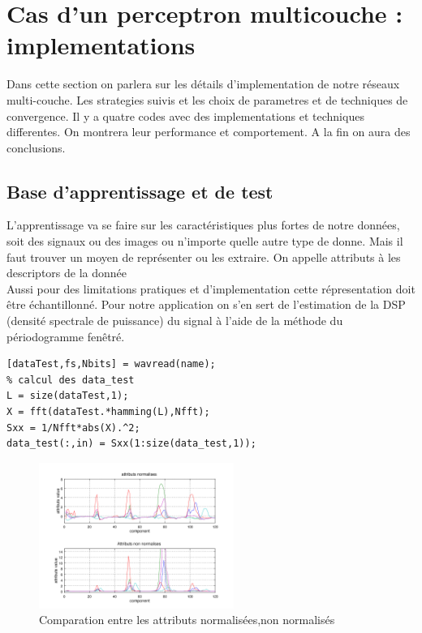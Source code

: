 \documentclass[journal]{IEEEtran}
\begin{document}
%
%
\section{Cas d’un perceptron multicouche : implementations}
Dans cette section on parlera sur les détails d'implementation de notre réseaux multi-couche. Les strategies
suivis et les choix de parametres et de techniques de convergence. Il y a quatre codes avec des implementations et techniques differentes. On montrera leur performance et comportement. A la fin on aura 
des conclusions.


\subsection{Base d'apprentissage et de test}
L'apprentissage va se faire sur les caractéristiques plus fortes de notre données, soit des signaux ou des images ou n'importe quelle autre type de donne. Mais il faut trouver un moyen de représenter ou  les extraire. On appelle attributs à les descriptors de la donnée\\
Aussi pour des limitations pratiques et d'implementation cette répresentation doit être échantillonné.
Pour notre application on s'en sert de l'estimation de la DSP (densité spectrale de puissance) du signal à l’aide de la méthode du périodogramme fenêtré.

\begin{lstlisting}[caption={Code puor initialisation des variables},label=code_initial]
[dataTest,fs,Nbits] = wavread(name);
% calcul des data_test
L = size(dataTest,1);
X = fft(dataTest.*hamming(L),Nfft);
Sxx = 1/Nfft*abs(X).^2;
data_test(:,in) = Sxx(1:size(data_test,1));
\end{lstlisting}


\begin{figure}[h]
	\centering
	\includegraphics[width=2.5in]{../OctaveNeurons/rs5}
	\caption{Comparation entre les attributs normalisées,non normalisés}
	\label{fig:AttributsNorm}
\end{figure}
\end{document}
